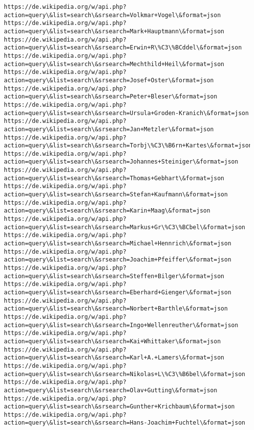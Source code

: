 \documentclass[11pt]{article}
\begin{document}
\begin{Verbatim}[commandchars=\\\{\}]
https://de.wikipedia.org/w/api.php?action=query\&list=search\&srsearch=Volkmar+Vogel\&format=json
https://de.wikipedia.org/w/api.php?action=query\&list=search\&srsearch=Mark+Hauptmann\&format=json
https://de.wikipedia.org/w/api.php?action=query\&list=search\&srsearch=Erwin+R\%C3\%BCddel\&format=json
https://de.wikipedia.org/w/api.php?action=query\&list=search\&srsearch=Mechthild+Heil\&format=json
https://de.wikipedia.org/w/api.php?action=query\&list=search\&srsearch=Josef+Oster\&format=json
https://de.wikipedia.org/w/api.php?action=query\&list=search\&srsearch=Peter+Bleser\&format=json
https://de.wikipedia.org/w/api.php?action=query\&list=search\&srsearch=Ursula+Groden-Kranich\&format=json
https://de.wikipedia.org/w/api.php?action=query\&list=search\&srsearch=Jan+Metzler\&format=json
https://de.wikipedia.org/w/api.php?action=query\&list=search\&srsearch=Torbj\%C3\%B6rn+Kartes\&format=json
https://de.wikipedia.org/w/api.php?action=query\&list=search\&srsearch=Johannes+Steiniger\&format=json
https://de.wikipedia.org/w/api.php?action=query\&list=search\&srsearch=Thomas+Gebhart\&format=json
https://de.wikipedia.org/w/api.php?action=query\&list=search\&srsearch=Stefan+Kaufmann\&format=json
https://de.wikipedia.org/w/api.php?action=query\&list=search\&srsearch=Karin+Maag\&format=json
https://de.wikipedia.org/w/api.php?action=query\&list=search\&srsearch=Markus+Gr\%C3\%BCbel\&format=json
https://de.wikipedia.org/w/api.php?action=query\&list=search\&srsearch=Michael+Hennrich\&format=json
https://de.wikipedia.org/w/api.php?action=query\&list=search\&srsearch=Joachim+Pfeiffer\&format=json
https://de.wikipedia.org/w/api.php?action=query\&list=search\&srsearch=Steffen+Bilger\&format=json
https://de.wikipedia.org/w/api.php?action=query\&list=search\&srsearch=Eberhard+Gienger\&format=json
https://de.wikipedia.org/w/api.php?action=query\&list=search\&srsearch=Norbert+Barthle\&format=json
https://de.wikipedia.org/w/api.php?action=query\&list=search\&srsearch=Ingo+Wellenreuther\&format=json
https://de.wikipedia.org/w/api.php?action=query\&list=search\&srsearch=Kai+Whittaker\&format=json
https://de.wikipedia.org/w/api.php?action=query\&list=search\&srsearch=Karl+A.+Lamers\&format=json
https://de.wikipedia.org/w/api.php?action=query\&list=search\&srsearch=Nikolas+L\%C3\%B6bel\&format=json
https://de.wikipedia.org/w/api.php?action=query\&list=search\&srsearch=Olav+Gutting\&format=json
https://de.wikipedia.org/w/api.php?action=query\&list=search\&srsearch=Gunther+Krichbaum\&format=json
https://de.wikipedia.org/w/api.php?action=query\&list=search\&srsearch=Hans-Joachim+Fuchtel\&format=json

\end{Verbatim}
\end{document}
